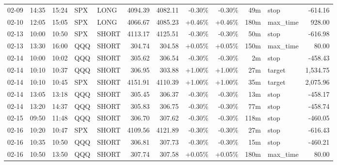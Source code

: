 \documentclass[11pt,a4paper,twoside]{article}
\begin{document}
\begin{center}
\begin{longtable}{>{\color{txtmain}}l l l l l r r r r r >{\color{txtmain}}l r}
02-09 & 14:35 & 15:24 & SPX & LONG & 4094.39 & 4082.11 & \textcolor{lossred}{-0.30\%} & \textcolor{lossred}{-0.30\%} & 49m & stop & \textcolor{lossred}{-614.16} \\
02-10 & 12:05 & 15:05 & SPX & LONG & 4066.67 & 4085.23 & \textcolor{wingreen}{+0.46\%} & \textcolor{wingreen}{+0.46\%} & 180m & max\_time & \textcolor{wingreen}{928.00} \\
02-13 & 10:00 & 10:50 & SPX & SHORT & 4113.17 & 4125.51 & \textcolor{lossred}{-0.30\%} & \textcolor{lossred}{-0.30\%} & 50m & stop & \textcolor{lossred}{-616.98} \\
02-13 & 13:30 & 16:00 & QQQ & SHORT & 304.74 & 304.58 & \textcolor{wingreen}{+0.05\%} & \textcolor{wingreen}{+0.05\%} & 150m & max\_time & \textcolor{wingreen}{80.00} \\
02-14 & 10:00 & 10:02 & QQQ & SHORT & 305.62 & 306.54 & \textcolor{lossred}{-0.30\%} & \textcolor{lossred}{-0.30\%} & 2m & stop & \textcolor{lossred}{-458.43} \\
02-14 & 10:10 & 10:37 & QQQ & SHORT & 306.95 & 303.88 & \textcolor{wingreen}{+1.00\%} & \textcolor{wingreen}{+1.00\%} & 27m & target & \textcolor{wingreen}{1,534.75} \\
02-14 & 10:10 & 10:45 & SPX & SHORT & 4151.91 & 4110.39 & \textcolor{wingreen}{+1.00\%} & \textcolor{wingreen}{+1.00\%} & 35m & target & \textcolor{wingreen}{2,075.96} \\
02-14 & 13:05 & 13:18 & QQQ & SHORT & 305.45 & 306.37 & \textcolor{lossred}{-0.30\%} & \textcolor{lossred}{-0.30\%} & 13m & stop & \textcolor{lossred}{-458.17} \\
02-14 & 13:20 & 14:37 & QQQ & SHORT & 305.83 & 306.75 & \textcolor{lossred}{-0.30\%} & \textcolor{lossred}{-0.30\%} & 77m & stop & \textcolor{lossred}{-458.74} \\
02-15 & 09:50 & 11:48 & QQQ & SHORT & 306.70 & 307.62 & \textcolor{lossred}{-0.30\%} & \textcolor{lossred}{-0.30\%} & 118m & stop & \textcolor{lossred}{-460.05} \\
02-16 & 10:20 & 10:47 & SPX & SHORT & 4109.56 & 4121.89 & \textcolor{lossred}{-0.30\%} & \textcolor{lossred}{-0.30\%} & 27m & stop & \textcolor{lossred}{-616.43} \\
02-16 & 10:35 & 10:50 & QQQ & SHORT & 306.81 & 307.73 & \textcolor{lossred}{-0.30\%} & \textcolor{lossred}{-0.30\%} & 15m & stop & \textcolor{lossred}{-460.21} \\
02-16 & 10:50 & 13:50 & QQQ & SHORT & 307.74 & 307.58 & \textcolor{wingreen}{+0.05\%} & \textcolor{wingreen}{+0.05\%} & 180m & max\_time & \textcolor{wingreen}{80.00} \\

\end{longtable}
\end{center}
\end{document}
